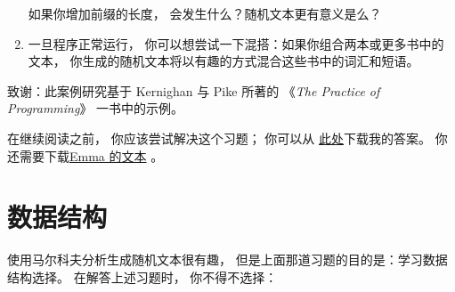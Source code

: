 \begin{exercise}
\begin{enumerate}
如果你增加前缀的长度， 会发生什么？随机文本更有意义是么？


\item 一旦程序正常运行， 你可以想尝试一下混搭：如果你组合两本或更多书中的文本， 
   你生成的随机文本将以有趣的方式混合这些书中的词汇和短语。  


\end{enumerate}


致谢：此案例研究基于 Kernighan 与 Pike 所著的 《{\em The Practice of
Programming}》 一书中的示例。  

\end{exercise}


在继续阅读之前， 你应该尝试解决这个习题；
你可以从 \href{http://thinkpython2.com/code/markov.py}{此处}下载我的答案。  
你还需要下载\href{http://thinkpython2.com/code/emma.txt}{Emma 的文本} 。  

\section{数据结构}


使用马尔科夫分析生成随机文本很有趣， 
但是上面那道习题的目的是：学习数据结构选择。  
在解答上述习题时， 你不得不选择：


